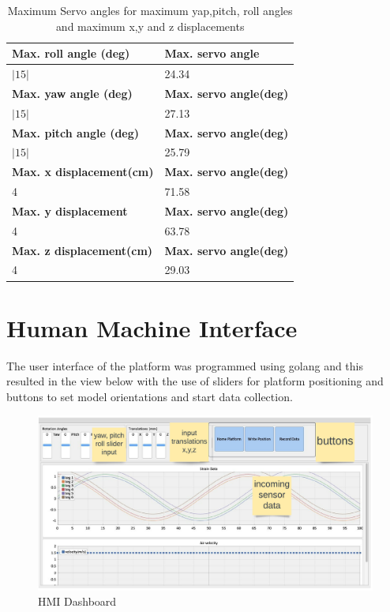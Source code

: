 \begin{center}
	\begin{table}[H]
	\centering
	\caption{Maximum Servo angles for maximum yap,pitch, roll angles and maximum x,y and z displacements}
	\label{roll}
	\centering
	\begin{tabular}{|l|l|}
	\hline
	\textbf{Max. roll angle (deg)}& \textbf{Max. servo angle} \\
	\hline
	 $|15|$& 24.34\\
	 \hline
\textbf{Max. yaw angle (deg)}& \textbf{Max. servo angle(deg)}\\
	\hline
	$|15|$& 27.13\\
	\hline
	\textbf{Max. pitch angle (deg)}& \textbf{Max. servo angle(deg)}\\
	\hline
	$|15|$& 25.79 \\
	\hline
	\textbf{Max. x displacement(cm)} & \textbf{Max. servo angle(deg)}\\
	\hline
	4 & 71.58 \\
	\hline
	\textbf{Max. y displacement} & \textbf{Max. servo angle(deg)}\\
	\hline
	4	& 63.78\\
	\hline
	\textbf{Max. z displacement(cm)} & \textbf{Max. servo angle(deg)}\\
	\hline
	4	& 29.03\\
	\hline
	\end{tabular}
\end{table}
\end{center}

\section{Human Machine Interface}
The user interface of the platform was programmed using golang and this resulted in the view below with the use of sliders for platform positioning and buttons to set model orientations and start data collection.
\begin{center}
	\begin{figure}[H]
	\centering
	\includegraphics[width=1\linewidth]{Figures/hmi}
	\caption[HMI Dashboard]{HMI Dashboard}
	\end{figure}
\end{center}

